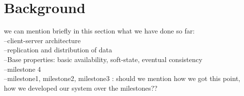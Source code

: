 \section{Background}
\label{sec:background}

we can mention briefly in this section what we have done so far:\\
--client-server architecture\\
--replication and distribution of data\\
--Base properties: basic availability, soft-state, eventual consistency\\
--milestone 4\\
--milestone1, milestone2, milestone3 : should we mention how we got this point, how we developed our system over the milestones??

